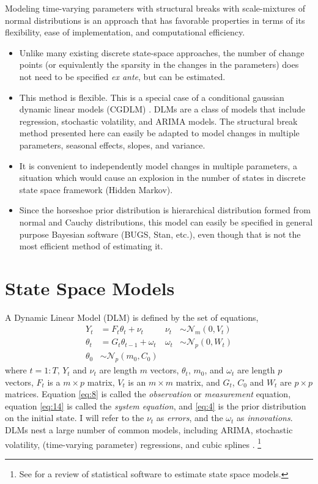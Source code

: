 \documentclass{article}
\newcommand{\paren}[1]{\ensuremath{\left(#1\right)}}
\newcommand{\dmvnorm}[2]{\ensuremath{\mathcal{N}_{#2}\paren{#1}}}
\begin{document}
Modeling time-varying parameters with structural breaks with scale-mixtures of normal distributions is an approach that has favorable properties in terms of its flexibility, ease of implementation, and computational efficiency.
\begin{itemize}
\item Unlike many existing discrete state-space approaches, the number of change points (or equivalently the sparsity in the changes in the parameters) does not need to be specified \textit{ex ante}, but can be estimated.
\item This method is flexible.
  This is a special case of a conditional gaussian dynamic linear models (CGDLM) \parencites{WestHarrison1997}{DurbinKoopman2001}{CommandeurKoopman2007}{ShumwayStoffer2010}.
  DLMs are a class of models that include regression, stochastic volatility, and ARIMA models.
  The structural break method presented here can easily be adapted to model changes in multiple parameters, seasonal effects, slopes, and variance.
\item It is convenient to independently model changes in multiple parameters, a situation which would cause an explosion in the number of states in discrete state space framework (Hidden Markov).
\item Since the horseshoe prior distribution is hierarchical distribution formed from normal and Cauchy distributions, this model can easily be specified in general purpose Bayesian software (BUGS, Stan, etc.), even though that is not the most efficient method of estimating it.
\end{itemize}

\section{State Space Models}

A Dynamic Linear Model (DLM) is defined by the set of equations,
\begin{align}
  \label{eq:8}
  Y_t &= F_{t} \theta_t + \nu_t & \nu_{t} &\sim \dmvnorm{0, V_{t}}{m} \\
  \label{eq:14}
  \theta_t &= G_{t} \theta_{t-1} + \omega_{t} & \omega_{t} &\sim \dmvnorm{0, W_{t}}{p} \\
  \label{eq:2}
  \theta_{0} & \sim \dmvnorm{m_{0}, C_{0}}{p}
\end{align}  
where $t = 1:T$, 
$Y_{t}$ and $\nu_{t}$ are length $m$ vectors,
$\theta_{t}$, $m_{0}$, and $\omega_{t}$ are length $p$ vectors,
$F_{t}$ is a $m \times p$ matrix, 
$V_{t}$ is an $m \times m$ matrix,
and $G_{t}$, $C_{0}$ and $W_{t}$ are $p \times p$ matrices.
Equation \eqref{eq:8} is called the \textit{observation} or \textit{measurement} equation, 
equation \eqref{eq:14} is called the \textit{system equation},
and \eqref{eq:4} is the prior distribution on the initial state.
I will refer to the $\nu_{t}$ as \textit{errors}, and the $\omega_{t}$ as \textit{innovations}.
DLMs nest a large number of common models, including ARIMA, stochastic volatility, (time-varying parameter) regressions,
and cubic splines \parencites{WestHarrison1997}{DurbinKoopman2001}{ShumwayStoffer2010}{CommandeurKoopman2007}.%
\footnote{See \textcite{CommandeurKoopmanOoms2011} for a review of statistical software to estimate state space models.}
\end{document}
